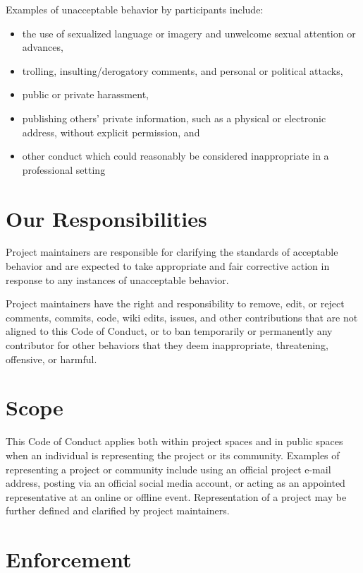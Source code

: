 \documentclass[]{Nemilov}
\providecommand{\tightlist}{%
  \setlength{\itemsep}{0pt}\setlength{\parskip}{0pt}}
\begin{document}
Examples of unacceptable behavior by participants include:

\begin{itemize}
\tightlist
\item
  the use of sexualized language or imagery and unwelcome sexual
  attention or advances,
\item
  trolling, insulting/derogatory comments, and personal or political
  attacks,
\item
  public or private harassment,
\item
  publishing others' private information, such as a physical or
  electronic address, without explicit permission, and
\item
  other conduct which could reasonably be considered inappropriate in
  a professional setting
\end{itemize}

\hypertarget{conduct-responsibilities}{%
\section{Our Responsibilities}\label{conduct-responsibilities}}

Project maintainers are responsible for clarifying the standards of acceptable
behavior and are expected to take appropriate and fair corrective action in
response to any instances of unacceptable behavior.

Project maintainers have the right and responsibility to remove, edit, or reject
comments, commits, code, wiki edits, issues, and other contributions that are
not aligned to this Code of Conduct, or to ban temporarily or permanently any
contributor for other behaviors that they deem inappropriate, threatening,
offensive, or harmful.

\hypertarget{conduct-scope}{%
\section{Scope}\label{conduct-scope}}

This Code of Conduct applies both within project spaces and in public spaces
when an individual is representing the project or its community. Examples of
representing a project or community include using an official project e-mail
address, posting via an official social media account, or acting as an appointed
representative at an online or offline event. Representation of a project may be
further defined and clarified by project maintainers.

\hypertarget{conduct-enforcement}{%
\section{Enforcement}\label{conduct-enforcement}}
\end{document}
